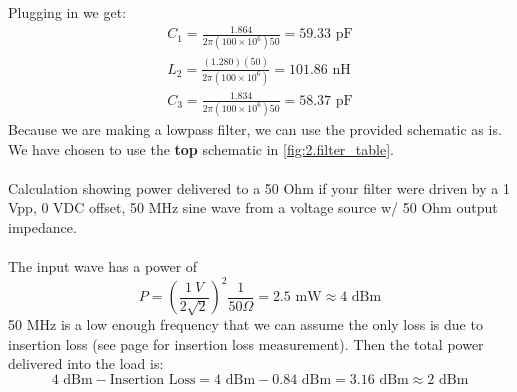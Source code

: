 \documentclass[letterpaper,12pt]{article}
\begin{document}
\noindent
Plugging in we get:
\begin{align*}
    C_1 = \frac{1.864}{2\pi(100\times10^6)50} = 59.33 \text{ pF} \\
    L_2 = \frac{(1.280)(50)}{2\pi(100\times10^6)} = 101.86 \text{ nH} \\
    C_3 = \frac{1.834}{2\pi(100\times10^6)50} = 58.37 \text{ pF}
\end{align*}
Because we are making a lowpass filter, we can use the provided schematic as is. We have chosen to use the \textbf{top} schematic in \ref{fig:2.filter_table}. \\
\\
Calculation showing power delivered to a 50 Ohm if your filter were driven by a 1 Vpp, 0 VDC offset, 50 MHz sine wave from a voltage source w/ 50 Ohm output impedance.\\
\\
The input wave has a power of
$$P=\left(\frac{1 \ V}{2\sqrt{2}}\right)^2 \frac{1}{50 \Omega} = 2.5 \text{ mW} \approx 4 \text{ dBm}$$
50 MHz is a low enough frequency that we can assume the only loss is due to insertion loss (see page \pageref{sec:s21_dcstop} for insertion loss measurement).
Then the total power delivered into the load is:
$$4 \text{ dBm} - \text{Insertion Loss} = 4 \text{ dBm} - 0.84 \text{ dBm} = 3.16 \text{ dBm} \approx 2 \text{ dBm} $$

\newpage
\end{document}
